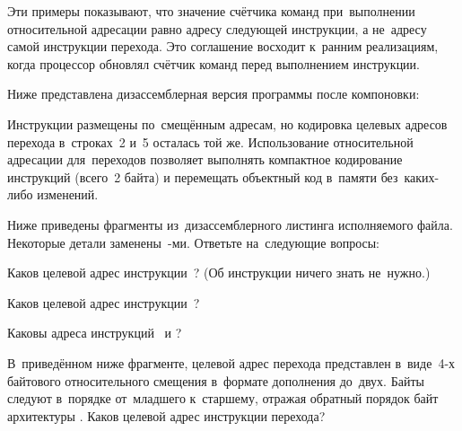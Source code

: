 Эти примеры показывают, что значение счётчика команд при~выполнении относительной адресации равно адресу следующей инструкции, а не~адресу самой инструкции перехода. Это соглашение восходит к~ранним реализациям, когда процессор обновлял счётчик команд перед выполнением инструкции.

Ниже представлена дизассемблерная версия программы после компоновки:


Инструкции размещены по~смещённым адресам, но кодировка целевых адресов перехода в~строках~2 и~5 осталась той же. Использование относительной адресации для~переходов позволяет выполнять компактное кодирование инструкций (всего~2 байта) и перемещать объектный код в~памяти без~каких-либо изменений.



\WhatToReadSection
\citeauthor[глава~3, стр.~218--225]{Bryant:2022:ru}



\ExercisesSection
\begin{exercise}
\item Ниже приведены фрагменты из~дизассемблерного листинга исполняемого файла. Некоторые детали заменены~-ми. Ответьте на~следующие вопросы:

\begin{enumIssue}
\item Каков целевой адрес инструкции~? (Об инструкции  ничего знать не~нужно.)
%


\item Каков целевой адрес инструкции~?
%


\item Каковы адреса инструкций~ и ?
%


\item В~приведённом ниже фрагменте, целевой адрес перехода представлен в~виде~4-х байтового относительного смещения в~формате дополнения до~двух. Байты следуют в~порядке от~младшего к~старшему, отражая обратный порядок байт архитектуры . Каков целевой адрес инструкции перехода?
%
\end{enumIssue}

\end{exercise}
